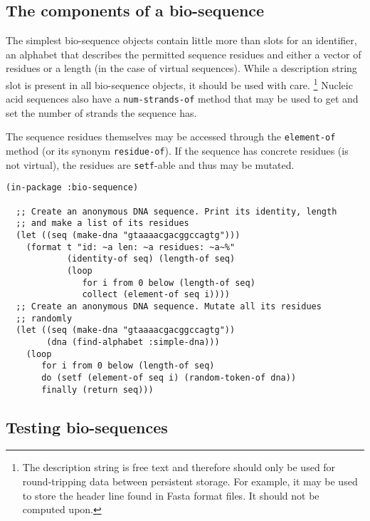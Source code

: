 \documentclass[a4paper, 12pt]{article}
\begin{document}
\subsection{The components of a bio-sequence}
\label{sec:component-bioseq}

The simplest bio-sequence objects contain little more than slots for
an identifier, an alphabet that describes the permitted sequence
residues and either a vector of residues or a length (in the case of
virtual sequences). While a description string slot is present in all
bio-sequence objects, it should be used with care. \footnote{The
  description string is free text and therefore should only be used
  for round-tripping data between persistent storage. For example, it
  may be used to store the header line found in Fasta format files. It
  should not be computed upon.}  Nucleic acid sequences also have a
\lstinline!num-strands-of! method that may be used to get and set the
number of strands the sequence has.

The sequence residues themselves may be accessed through the
\lstinline!element-of! method (or its synonym
\lstinline!residue-of!). If the sequence has concrete residues (is not
virtual), the residues are \lstinline!setf!-able and thus may be
mutated.


\begin{lstlisting}[caption={The components of a bio-sequence},
  label=use-bioseq-alphabets]
  (in-package :bio-sequence)

  ;; Create an anonymous DNA sequence. Print its identity, length
  ;; and make a list of its residues
  (let ((seq (make-dna "gtaaaacgacggccagtg")))
    (format t "id: ~a len: ~a residues: ~a~%"
            (identity-of seq) (length-of seq)
            (loop
               for i from 0 below (length-of seq)
               collect (element-of seq i))))
  ;; Create an anonymous DNA sequence. Mutate all its residues
  ;; randomly
  (let ((seq (make-dna "gtaaaacgacggccagtg"))
        (dna (find-alphabet :simple-dna)))
    (loop
       for i from 0 below (length-of seq)
       do (setf (element-of seq i) (random-token-of dna))
       finally (return seq)))                               
\end{lstlisting}


\subsection{Testing bio-sequences}



\end{document}

